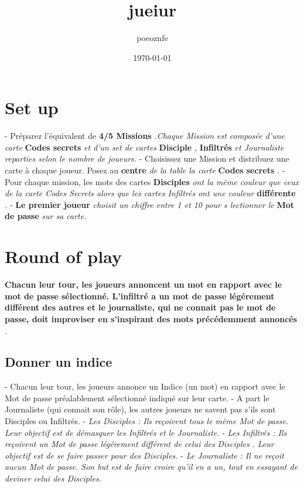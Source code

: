 \documentclass{article}%
\title{jueiur}%
\author{poeoznfe}%
\date{\today}%
\begin{document}
%
\pagestyle{empty}%
\normalsize%
\maketitle%
\section{ Set up
}%
\label{sec:Setup}%
{-} Préparez l'équivalent de %
\textbf{4/5 Missions}%
\textit{.Chaque Mission est composée d'une carte }%
\textbf{Codes secrets}%
\textit{ et d'un set de cartes }%
\textbf{Disciple}%
\textit{,}%
\textbf{ Infiltrés}%
\textit{ et Journaliste reparties selon le nombre de joueurs.
}%
{-} Choisissez une Mission et distribuez une carte à chaque joueur. Posez au %
\textbf{centre}%
\textit{ de la table la carte }%
\textbf{Codes secrets}%
\textit{.
}%
{-} Pour chaque mission, les mots des cartes %
\textbf{Disciples}%
\textit{ ont la même couleur que ceux de la carte Codes Secrets alors que les cartes Infiltrés ont une couleur }%
\textbf{différente}%
\textit{.
}%
{-} %
\textbf{Le premier joueur}%
\textit{ choisit un chiffre entre 1 et 10 pour s lectionner le }%
\textbf{Mot de passe}%
\textit{ sur sa carte.
}

%
\section{ Round of play
}%
\label{sec:Roundofplay}%
\textbf{Chacun leur tour, les joueurs annoncent un mot en rapport avec le mot de passe sélectionné. L'infiltré a un mot de passe légérement différent des autres et le journaliste, qui ne connait pas le mot de passe, doit improviser en s'inspirant des mots précédemment annoncés}%
\textit{.
}

%
\subsection{ Donner un indice
}%
\label{subsec:Donnerunindice}%
{-} Chacun leur tour, les joueurs annonce un Indice (un mot) en rapport avec le Mot de passe préalablement sélectionné indiqué sur leur carte.
%
{-} A part le Journaliste (qui connait son rôle), les autres joueurs ne savent pas s'ils sont Disciples ou Infiltrés.
%
{-} %
\textit{Les Disciples}%
\textit{ : Ils reçoivent tous le même Mot de passe. Leur objectif est de démasquer les Infiltrés et le Journaliste.
}%
{-} %
\textit{Les Infiltrés}%
\textit{ : Ils reçoivent un Mot de passe légérement différent de celui des }%
\textit{Disciples}%
\textit{. Leur objectif est de se faire passer pour des Disciples.
}%
{-} %
\textit{Le Journaliste}%
\textit{ : Il ne reçoit aucun Mot de passe. Son but est de faire croire qu'il en a un, tout en essayant de deviner celui des Disciples.
}
\end{document}
